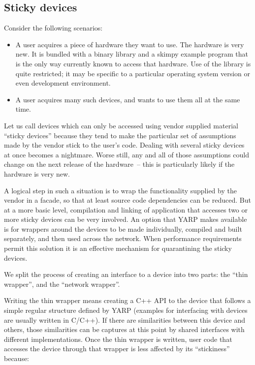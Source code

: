 \subsection{Sticky devices}

Consider the following scenarios:

\begin{itemize}

\item A user acquires a piece of hardware they want to use.  The
hardware is very new.  It is bundled with a binary library and a
skimpy example program that is the only way currently known to access
that hardware.  Use of the library is quite restricted; it may be
specific to a particular operating system version or even development
environment.

\item A user acquires many such devices, and wants to use them
all at the same time.

\end{itemize}

Let us call devices which can only be accessed using vendor supplied
material ``sticky devices'' because they tend to make the particular
set of assumptions made by the vendor stick to the user's code.
Dealing with several sticky devices at once becomes a nightmare.
Worse still, any and all of those assumptions could change on the
next release of the hardware~-- this is particularly likely if the 
hardware is very new.

A logical step in such a situation is to wrap the functionality
supplied by the vendor in a facade, so that at least source code
dependencies can be reduced.  But at a more basic level,
compilation and linking of application that accesses two or more
sticky devices can be very involved.  An option that YARP makes
available is for wrappers around the devices to be made individually,
compiled and built separately, and then used across the network.
When performance requirements permit this solution it is an
effective mechanism for quarantining the sticky devices.

We split the process of creating an interface to a device into two
parts: the ``thin wrapper'', and the ``network wrapper''.  

Writing the thin wrapper means creating a C++ API to the device
that follows a simple regular structure defined by YARP
(examples for interfacing with devices are usually written in C/C++).
If there are similarities between this device and others,
those similarities can be captures at this point by 
shared interfaces with different implementations.
Once the thin wrapper is written, user code that accesses
the device through that wrapper is less affected by its ``stickiness''
because:

